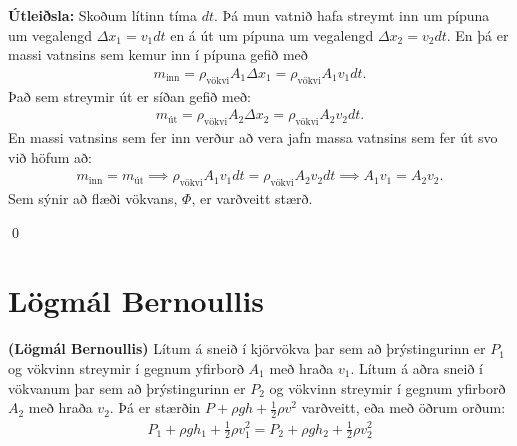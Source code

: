 \ifdefined \wholebook \else\documentclass[oneside]{book}\usepackage{EdlBook}\graphicspath{{figures/}}
\begin{document}
\textbf{Útleiðsla:} Skoðum lítinn tíma $dt$. Þá mun vatnið hafa streymt inn um pípuna um vegalengd $\Delta x_1 = v_1 dt$ en á út um pípuna um vegalengd $\Delta x_2 = v_2 dt$. En þá er massi vatnsins sem kemur inn í pípuna gefið með
\begin{align*}
    m_{\text{inn}} = \rho_{\text{vökvi}} A_1 \Delta x_1 = \rho_{\text{vökvi}} A_1 v_1 dt.
\end{align*}
Það sem streymir út er síðan gefið með:
\begin{align*}
    m_{\text{út}} = \rho_{\text{vökvi}} A_2 \Delta x_2 = \rho_{\text{vökvi}} A_2 v_2 dt.
\end{align*}
En massi vatnsins sem fer inn verður að vera jafn massa vatnsins sem fer út svo við höfum að:
\begin{align*}
    m_{\text{inn}} = m_{\text{út}} \implies \rho_{\text{vökvi}} A_1 v_1 dt =  \rho_{\text{vökvi}} A_2 v_2 dt \implies A_1 v_1 = A_2 v_2.
\end{align*}
Sem sýnir að flæði vökvans, $\Phi$, er varðveitt stærð.

\qed



\section{Lögmál Bernoullis}

\begin{tcolorbox}
\begin{theorem}
\textbf{(Lögmál Bernoullis)} Lítum á sneið í kjörvökva þar sem að þrýstingurinn er $P_1$ og vökvinn streymir í gegnum yfirborð $A_1$ með hraða $v_1$. Lítum á aðra sneið í vökvanum þar sem að þrýstingurinn er $P_2$ og vökvinn streymir í gegnum yfirborð $A_2$ með hraða $v_2$. Þá er stærðin $ P + \rho g h + \frac{1}{2}\rho v^2$ varðveitt, eða með öðrum orðum:
\begin{align*}
    P_1 + \rho g h_1 + \frac{1}{2}\rho v_1^2 =  P_2 + \rho g h_2 + \frac{1}{2}\rho v_2^2
\end{align*}
\end{theorem}
\end{tcolorbox}
\end{document}
